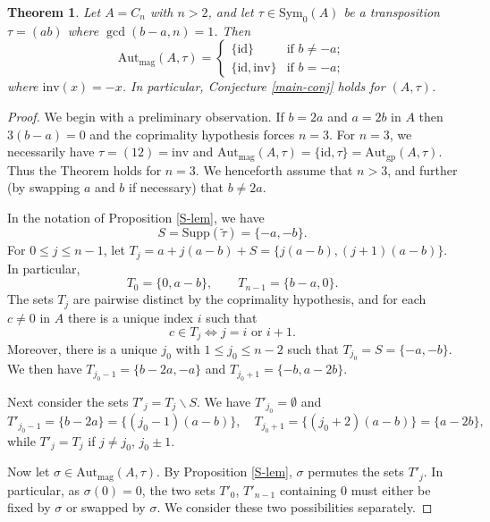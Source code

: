 \documentclass[letterpaper,12pt]{amsart}
\numberwithin{equation}{section}
\numberwithin{algorithm}{section}
\newtheorem{theorem}[lemma]{Theorem}
\theoremstyle{definition}
\newcommand{\id}{\mathrm{id}}
\newcommand{\LRA}{\Leftrightarrow}
\newcommand{\inv}{\mathrm{inv}}
\newcommand{\Autgp}{\mathrm{Aut}_{\mathrm{gp}}}
\newcommand{\Autmag}{\mathrm{Aut}_\mathrm{mag}}
\newcommand{\Symo}{\mathrm{Sym}_0}
\newcommand{\ttau}{\tilde{\tau}}
\newcommand{\bs}{\backslash}
\newcommand{\Supp}{\mathrm{Supp}}
\begin{document}
\begin{theorem} \label{trans-thm}
Let $A=C_n$ with $n>2$, and let $\tau \in \Symo(A)$ be a transposition $\tau=(ab)$ where $\gcd(b-a,n)=1$. Then	
\begin{equation} \label{transp-aut}
		\Autmag(A,\tau) = \begin{cases} \{\id\} & \mbox{if } b \neq -a; \\
		\{\id, \inv\} & \mbox{if } b =-a;
	\end{cases} 
\end{equation}
where $\inv(x)=-x$. In particular, Conjecture \ref{main-conj} holds for $(A, \tau)$. 
\end{theorem}
\begin{proof}

We begin with a preliminary observation. If $b=2a$ and $a=2b$ in $A$ then $3(b-a)=0$ and the coprimality hypothesis forces $n=3$. For $n=3$, we necessarily have $\tau=(12)=\inv$ and $\Autmag(A,\tau)=\{\id, \tau \}=\Autgp(A,\tau)$. Thus the Theorem holds for $n=3$. We henceforth assume that $n>3$, and further (by swapping $a$ and $b$ if necessary) that $b \neq 2a$. 

In the notation of Proposition \ref{S-lem}, we have 
$$ S= \Supp(\ttau)=	\{-a,-b\}. $$ 
For $0 \leq j \leq n-1$, let $T_j=a+j(a-b)+S = \{j(a-b), (j+1)(a-b)\}$. In particular, 
$$  	T_0 =  \{ 0, a-b\},  \qquad 	T_{n-1} = \{ b-a, 0 \}.  $$ 
The sets $T_j$ are pairwise distinct by the coprimality hypothesis, and for each $c \neq 0$ in $A$ there is a unique index $i$ such that 
$$ c \in T_j \LRA j=i \mbox{ or } i+1. $$ 
Moreover, there is a unique $j_0$ with $1 \leq j_0 \leq n-2$ such that $T_{j_0} = S= \{-a,-b\}$. We then have $T_{j_0-1} = \{b-2a, -a\}$ and $T_{j_0+1} = \{ -b, a-2b \}$. 

Next consider the sets $T'_j=T_j \bs S$. We have $T'_{j_0}= \emptyset$ and 
$$ T'_{j_0-1}=\{b-2a\}=\{(j_0-1)(a-b)\}, \quad T_{j_0+1} = \{(j_0+2)(a-b)\} = \{a-2b \}, $$ 
while $T'_j=T_j$ if $j \neq j_0$, $j_0 \pm 1$. 

Now let $\sigma \in \Autmag(A,\tau)$. By Proposition \ref{S-lem}, $\sigma$ permutes the sets $T'_j$. In particular, as $\sigma(0)=0$, the two sets $T'_0$, $T'_{n-1}$ containing $0$ must either be fixed by $\sigma$ or swapped by $\sigma$. 
We consider these two possibilities separately.
	

\end{proof}
\end{document}
